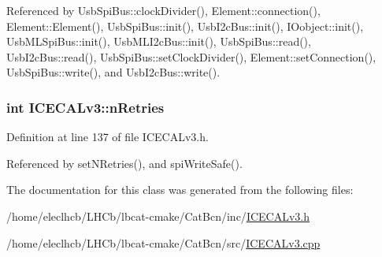 Referenced by UsbSpiBus::clockDivider(), Element::connection(), Element::Element(), UsbSpiBus::init(), UsbI2cBus::init(), IOobject::init(), UsbMLSpiBus::init(), UsbMLI2cBus::init(), UsbSpiBus::read(), UsbI2cBus::read(), UsbSpiBus::setClockDivider(), Element::setConnection(), UsbSpiBus::write(), and UsbI2cBus::write().\hypertarget{classICECALv3_ae877ce34b3a4d6c368cc6409ac9614fa}{
\subsubsection[{nRetries}]{\setlength{\rightskip}{0pt plus 5cm}int {\bf ICECALv3::nRetries}}}
\label{classICECALv3_ae877ce34b3a4d6c368cc6409ac9614fa}


Definition at line 137 of file ICECALv3.h.

Referenced by setNRetries(), and spiWriteSafe().

The documentation for this class was generated from the following files:\begin{DoxyCompactItemize}
\item 
/home/eleclhcb/LHCb/lbcat-\/cmake/CatBcn/inc/\hyperlink{ICECALv3_8h}{ICECALv3.h}\item 
/home/eleclhcb/LHCb/lbcat-\/cmake/CatBcn/src/\hyperlink{ICECALv3_8cpp}{ICECALv3.cpp}\end{DoxyCompactItemize}
